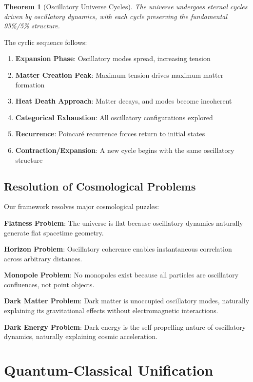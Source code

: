 \documentclass[11pt]{article}
\newtheorem{theorem}{Theorem}[section]
\theoremstyle{remark}
\begin{document}
\begin{theorem}[Oscillatory Universe Cycles]
The universe undergoes eternal cycles driven by oscillatory dynamics, with each cycle preserving the fundamental 95\%/5\% structure.
\end{theorem}

The cyclic sequence follows:
\begin{enumerate}
\item \textbf{Expansion Phase}: Oscillatory modes spread, increasing tension
\item \textbf{Matter Creation Peak}: Maximum tension drives maximum matter formation
\item \textbf{Heat Death Approach}: Matter decays, and modes become incoherent
\item \textbf{Categorical Exhaustion}: All oscillatory configurations explored
\item \textbf{Recurrence}: Poincaré recurrence forces return to initial states
\item \textbf{Contraction/Expansion}: A new cycle begins with the same oscillatory structure
\end{enumerate}

\subsection{Resolution of Cosmological Problems}

Our framework resolves major cosmological puzzles:

\textbf{Flatness Problem}: The universe is flat because oscillatory dynamics naturally generate flat spacetime geometry.

\textbf{Horizon Problem}: Oscillatory coherence enables instantaneous correlation across arbitrary distances.

\textbf{Monopole Problem}: No monopoles exist because all particles are oscillatory confluences, not point objects.

\textbf{Dark Matter Problem}: Dark matter is unoccupied oscillatory modes, naturally explaining its gravitational effects without electromagnetic interactions.

\textbf{Dark Energy Problem}: Dark energy is the self-propelling nature of oscillatory dynamics, naturally explaining cosmic acceleration.

\section{Quantum-Classical Unification}
\end{document}
